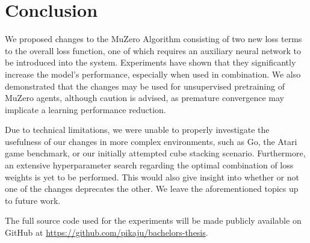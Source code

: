 \section{Conclusion}
We proposed changes to the MuZero Algorithm consisting of two new loss terms to the overall loss function, one of which requires an auxiliary neural network to be introduced into the system. Experiments have shown that they significantly increase the model's performance, especially when used in combination. We also demonstrated that the changes may be used for unsupervised pretraining of MuZero agents, although caution is advised, as premature convergence may implicate a learning performance reduction.

Due to technical limitations, we were unable to properly investigate the usefulness of our changes in more complex environments, such as Go, the Atari game benchmark, or our initially attempted cube stacking scenario. Furthermore, an extensive hyperparameter search regarding the optimal combination of loss weights is yet to be performed. This would also give insight into whether or not one of the changes deprecates the other. We leave the aforementioned topics up to future work.

The full source code used for the experiments will be made publicly available on GitHub at \url{https://github.com/pikaju/bachelors-thesis}.
